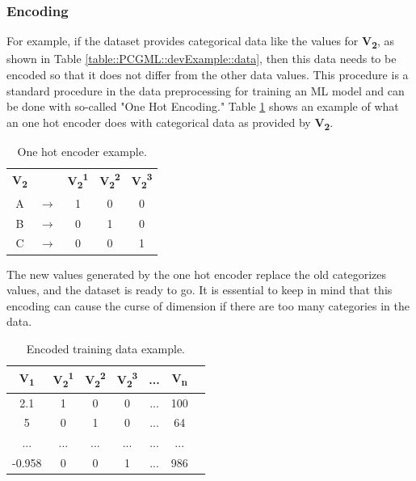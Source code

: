 \documentclass[MGS,Master,english]{twbook}%
\begin{document}
\subsubsection{Encoding}
For example, if the dataset provides categorical data like the values for \textbf{V\textsubscript{2}}, as shown in Table \ref{table::PCGML::devExample::data}, then this data needs to be encoded so that it does not differ from the other data values. This procedure is a standard procedure in the data preprocessing for training an \ac{ML} model and can be done with so-called "One Hot Encoding." Table \ref{table::PCGML::devExample::oneHotEncoder} shows an example of what an one hot encoder does with categorical data as provided by \textbf{V\textsubscript{2}}. 
\begin{table}[!ht]
	\centering
	\begin{tabular}{|c|c|c|c|c|}
		\cline{1-1} \cline{3-5}
		\textbf{V\textsubscript{2}} &  & \textbf{V\textsubscript{2}\textsuperscript{1}} & \textbf{V\textsubscript{2}\textsuperscript{2}} & \textbf{V\textsubscript{2}\textsuperscript{3}} \\ \hhline{=~===}
		A           & $\longrightarrow$         & 1           & 0           & 0           \\ \cline{1-1} \cline{3-5} 
		B           & $\longrightarrow$         & 0           & 1           & 0           \\ \cline{1-1} \cline{3-5} 
		C           & $\longrightarrow$         & 0           & 0           & 1           \\ \cline{1-1} \cline{3-5} 
	\end{tabular}
	\caption{One hot encoder example.}
	\label{table::PCGML::devExample::oneHotEncoder}
\end{table}
The new values generated by the one hot encoder replace the old categorizes values, and the dataset is ready to go. It is essential to keep in mind that this encoding can cause the curse of dimension if there are too many categories in the data.
\begin{table}[!ht]
	\centering
	\begin{tabular}{|c|c|c|c|c|c|c|}
		\hline
		\textbf{V\textsubscript{1}} & \textbf{V\textsubscript{2}\textsuperscript{1}}& \textbf{V\textsubscript{2}\textsuperscript{2}}& \textbf{V\textsubscript{2}\textsuperscript{3}} & \textbf{...} & \textbf{V\textsubscript{n}} \\ \hline\hline
		2.1         & 1   & 0   & 0       & ...          & 100         \\ \hline
		5           & 0   & 1   & 0       & ...          & 64          \\ \hline
		...         & ... & ... & ...     & ...          & ...         \\ \hline
		-0.958      & 0   & 0   & 1       & ...          & 986         \\ \hline
	\end{tabular}
	\caption{Encoded training data example.}
	\label{table::PCGML::devExample::data_encoded}
\end{table}
\end{document}
